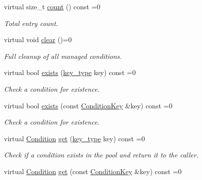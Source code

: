 \begin{DoxyCompactItemize}
virtual size\_\-t \hyperlink{class_d_d4hep_1_1_conditions_1_1_user_pool_ac5f4c186c5037f379e3c12e2daa21a5e}{count} () const =0
\begin{DoxyCompactList}\small\item\em Total entry count. \item\end{DoxyCompactList}\item 
virtual void \hyperlink{class_d_d4hep_1_1_conditions_1_1_user_pool_aa1b208b96c66bee13ee9f2bd6b7aaac5}{clear} ()=0
\begin{DoxyCompactList}\small\item\em Full cleanup of all managed conditions. \item\end{DoxyCompactList}\item 
virtual bool \hyperlink{class_d_d4hep_1_1_conditions_1_1_user_pool_abe05e40f8f674ff18a525b27012aa8d4}{exists} (\hyperlink{class_d_d4hep_1_1_conditions_1_1_user_pool_aa256cf1e22de1b9f2a84d39309b8bfa9}{key\_\-type} key) const =0
\begin{DoxyCompactList}\small\item\em Check a condition for existence. \item\end{DoxyCompactList}\item 
virtual bool \hyperlink{class_d_d4hep_1_1_conditions_1_1_user_pool_af61d57de60db641dc8db117e2a03d3d7}{exists} (const \hyperlink{class_d_d4hep_1_1_conditions_1_1_condition_key}{ConditionKey} \&key) const =0
\begin{DoxyCompactList}\small\item\em Check a condition for existence. \item\end{DoxyCompactList}\item 
virtual \hyperlink{class_d_d4hep_1_1_conditions_1_1_condition}{Condition} \hyperlink{class_d_d4hep_1_1_conditions_1_1_user_pool_ad02d5ac6dfb83a6c9fa2b7a891ecde08}{get} (\hyperlink{class_d_d4hep_1_1_conditions_1_1_user_pool_aa256cf1e22de1b9f2a84d39309b8bfa9}{key\_\-type} key) const =0
\begin{DoxyCompactList}\small\item\em Check if a condition exists in the pool and return it to the caller. \item\end{DoxyCompactList}\item 
virtual \hyperlink{class_d_d4hep_1_1_conditions_1_1_condition}{Condition} \hyperlink{class_d_d4hep_1_1_conditions_1_1_user_pool_a1b03fc2a7215f2e88739d4ecfb4f073a}{get} (const \hyperlink{class_d_d4hep_1_1_conditions_1_1_condition_key}{ConditionKey} \&key) const =0

\end{DoxyCompactItemize}
